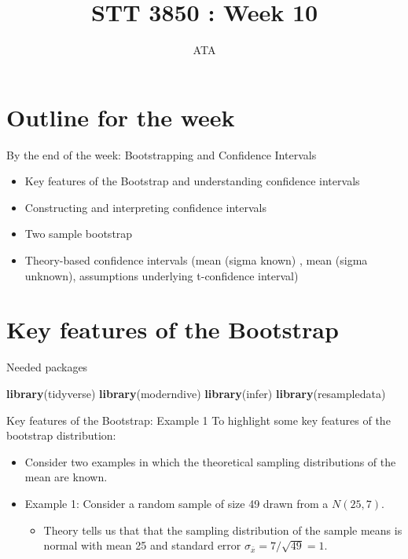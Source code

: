 \documentclass[
  ignorenonframetext,
]{beamer}
\title{STT 3850 : Week 10}
\author{ATA}
\date{}
\institute{Appalachian State University}
\newenvironment{Shaded}{\begin{snugshade}}{\end{snugshade}}
\newcommand{\FunctionTok}[1]{\textcolor[rgb]{0.13,0.29,0.53}{\textbf{#1}}}
\newcommand{\NormalTok}[1]{#1}
\providecommand{\tightlist}{%
  \setlength{\itemsep}{0pt}\setlength{\parskip}{0pt}}
\begin{document}
\frame{\titlepage}

\section{Outline for the week}\label{outline-for-the-week}

\begin{frame}{By the end of the week: Bootstrapping and Confidence
Intervals}
\label{by-the-end-of-the-week-bootstrapping-and-confidence-intervals}
\begin{itemize}
\item
  Key features of the Bootstrap and understanding confidence intervals
\item
  Constructing and interpreting confidence intervals
\item
  Two sample bootstrap
\item
  Theory-based confidence intervals (mean (sigma known) , mean (sigma
  unknown), assumptions underlying t-confidence interval)
\end{itemize}
\end{frame}

\section{Key features of the
Bootstrap}\label{key-features-of-the-bootstrap}

\begin{frame}[fragile]{Needed packages}
\label{needed-packages}
\small

\begin{Shaded}
\begin{Highlighting}[]
\FunctionTok{library}\NormalTok{(tidyverse)}
\FunctionTok{library}\NormalTok{(moderndive)}
\FunctionTok{library}\NormalTok{(infer)}
\FunctionTok{library}\NormalTok{(resampledata)}
\end{Highlighting}
\end{Shaded}

\normalsize
\end{frame}

\begin{frame}{Key features of the Bootstrap: Example 1}
\label{key-features-of-the-bootstrap-example-1}
To highlight some key features of the bootstrap distribution:

\begin{itemize}
\item
  Consider two examples in which the theoretical sampling distributions
  of the mean are known.
\item
  Example 1: Consider a random sample of size 49 drawn from a
  \(N(25, 7)\).

  \begin{itemize}
  \tightlist
  \item
    Theory tells us that that the sampling distribution of the sample
    means is normal with mean 25 and standard error
    \(\sigma_{\bar{x}}=7/\sqrt{49}=1\).
  \end{itemize}
\end{itemize}
\end{frame}
\end{document}
